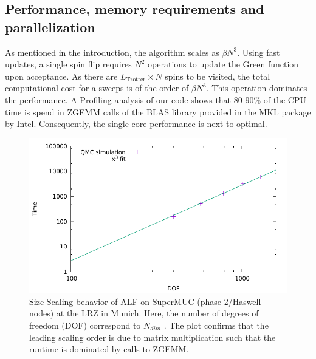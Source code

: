\subsection{Performance, memory requirements and parallelization}


As mentioned in the  introduction, the algorithm scales as $\beta N^3$. Using fast updates,  a single spin flip  requires $N^2$ operations to update the Green function upon acceptance.  As there are $L_{\text{Trotter}}\times N$ spins to be visited, the total computational cost for a sweeps is of the order of $\beta N^3$. This operation  dominates the performance. A Profiling analysis of our code shows that 80-90\% of the CPU time is spend in ZGEMM calls of the BLAS library provided in the MKL package by Intel. Consequently, the single-core performance is next to optimal.

\begin{figure}[h]
	\begin{center}
		\includegraphics[scale=.8]{Figures/Size_scaling_ALF.pdf}
	\end{center}
	\caption{\label{fig_scaling_size}Size Scaling behavior of ALF on SuperMUC (phase 2/Haswell nodes) at the LRZ in Munich. Here, the number of  degrees of freedom (DOF) correspond to  $N_{dim}$ .   The plot confirms that the leading scaling order is due to matrix multiplication such that the runtime is dominated by calls to ZGEMM. }
\end{figure}

